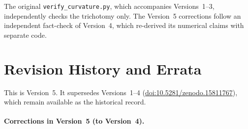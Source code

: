\documentclass[12pt]{article}
\theoremstyle{remark}
\begin{document}
The original \texttt{verify\_curvature.py}, which accompanies Versions~1--3, independently
checks the trichotomy only. The Version~5 corrections follow an independent fact-check of
Version~4, which re-derived its numerical claims with separate code.

\section{Revision History and Errata}\label{sec:errata}

This is Version~5. It supersedes Versions~1--4
(\href{https://doi.org/10.5281/zenodo.15811767}{doi:10.5281/zenodo.15811767}), which
remain available as the historical record.

\paragraph{Corrections in Version~5 (to Version~4).}
\end{document}
